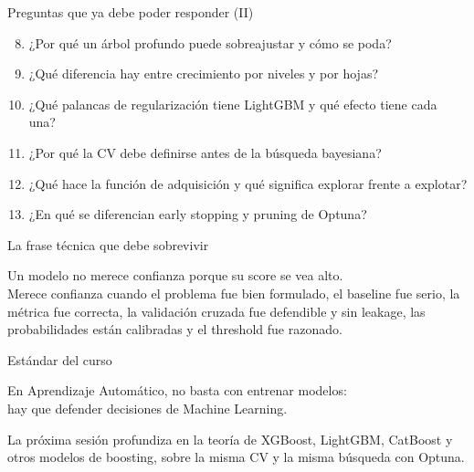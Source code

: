 \documentclass[aspectratio=169,12pt]{beamer}
\begin{document}
\begin{frame}{Preguntas que ya debe poder responder (II)}
  \small
  \begin{enumerate}\setcounter{enumi}{7}
    \item ¿Por qué un árbol profundo puede sobreajustar y cómo se poda?
    \item ¿Qué diferencia hay entre crecimiento por niveles y por hojas?
    \item ¿Qué palancas de regularización tiene LightGBM y qué efecto tiene cada una?
    \item ¿Por qué la CV debe definirse antes de la búsqueda bayesiana?
    \item ¿Qué hace la función de adquisición y qué significa explorar frente a explotar?
    \item ¿En qué se diferencian early stopping y pruning de Optuna?
  \end{enumerate}
\end{frame}

\begin{frame}{La frase técnica que debe sobrevivir}
  \large
  \begin{center}
    Un modelo no merece confianza porque su score se vea alto.\\[8pt]
    Merece confianza cuando el problema fue bien formulado, el baseline fue serio, la métrica fue correcta, la validación cruzada fue defendible y sin leakage, las probabilidades están calibradas y el threshold fue razonado.
  \end{center}
\end{frame}

\begin{frame}{Estándar del curso}
  \begin{center}
    \large En Aprendizaje Automático, no basta con entrenar modelos:\\[8pt]
    hay que defender decisiones de Machine Learning.
  \end{center}
  \vspace{6pt}
  \begin{keybox}[Transición]
    \small La próxima sesión profundiza en la teoría de XGBoost, LightGBM, CatBoost y otros modelos de boosting, sobre la misma CV y la misma búsqueda con Optuna.
  \end{keybox}
\end{frame}
\end{document}

